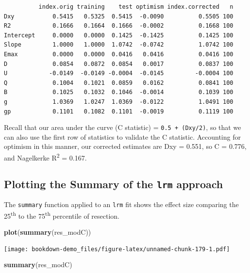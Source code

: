 \documentclass[]{book}
\newenvironment{Shaded}{\begin{snugshade}}{\end{snugshade}}
\newcommand{\KeywordTok}[1]{\textcolor[rgb]{0.13,0.29,0.53}{\textbf{#1}}}
\newcommand{\NormalTok}[1]{#1}
\theoremstyle{definition}
\theoremstyle{definition}
\theoremstyle{definition}
\theoremstyle{remark}
\begin{document}
\begin{verbatim}
          index.orig training    test optimism index.corrected   n
Dxy           0.5415   0.5325  0.5415  -0.0090          0.5505 100
R2            0.1666   0.1664  0.1666  -0.0002          0.1668 100
Intercept     0.0000   0.0000  0.1425  -0.1425          0.1425 100
Slope         1.0000   1.0000  1.0742  -0.0742          1.0742 100
Emax          0.0000   0.0000  0.0416   0.0416          0.0416 100
D             0.0854   0.0872  0.0854   0.0017          0.0837 100
U            -0.0149  -0.0149 -0.0004  -0.0145         -0.0004 100
Q             0.1004   0.1021  0.0859   0.0162          0.0841 100
B             0.1025   0.1032  0.1046  -0.0014          0.1039 100
g             1.0369   1.0247  1.0369  -0.0122          1.0491 100
gp            0.1101   0.1082  0.1101  -0.0019          0.1119 100
\end{verbatim}

Recall that our area under the curve (C statistic) =
\texttt{0.5\ +\ (Dxy/2)}, so that we can also use the first row of
statistics to validate the C statistic. Accounting for optimism in this
manner, our corrected estimates are Dxy = 0.551, so C = 0.776, and
Nagelkerke R\textsuperscript{2} = 0.167.

\subsection{\texorpdfstring{Plotting the Summary of the \texttt{lrm}
approach}{Plotting the Summary of the lrm approach}}\label{plotting-the-summary-of-the-lrm-approach}

The \texttt{summary} function applied to an \texttt{lrm} fit shows the
effect size comparing the 25\textsuperscript{th} to the
75\textsuperscript{th} percentile of resection.

\begin{Shaded}
\begin{Highlighting}[]
\KeywordTok{plot}\NormalTok{(}\KeywordTok{summary}\NormalTok{(res_modC))}
\end{Highlighting}
\end{Shaded}

\texttt{[image: bookdown-demo\_files/figure-latex/unnamed-chunk-179-1.pdf]}

\begin{Shaded}
\begin{Highlighting}[]
\KeywordTok{summary}\NormalTok{(res_modC)}
\end{Highlighting}
\end{Shaded}
\end{document}

